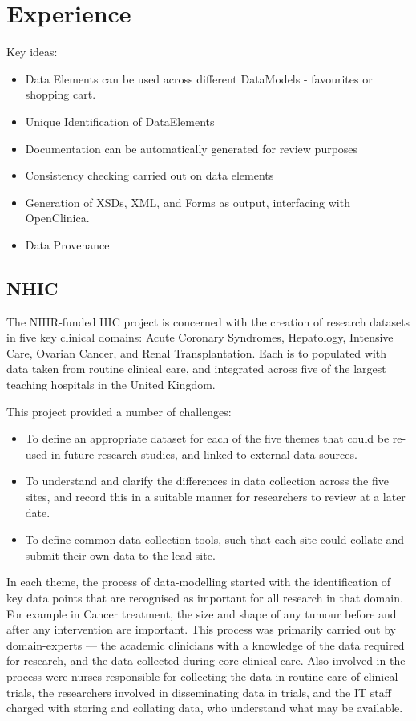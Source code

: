 \section{Experience}

Key ideas:

\begin{itemize}
	\item Data Elements can be used across different DataModels - favourites or shopping cart.
	\item Unique Identification of DataElements 
	\item Documentation can be automatically generated for review purposes
	\item Consistency checking carried out on data elements
	\item Generation of XSDs, XML, and Forms as output, interfacing with OpenClinica.
	\item Data Provenance
\end{itemize}


\subsection{NHIC}

The NIHR-funded HIC project is concerned with the creation of research
datasets in five key clinical domains: Acute Coronary Syndromes,
Hepatology, Intensive Care, Ovarian Cancer, and Renal Transplantation.
Each is to populated with data taken from routine clinical care, and
integrated across five of the largest teaching hospitals in the United
Kingdom.

This project provided a number of challenges:

\begin{itemize}
\item To define an appropriate dataset for each of the five themes
  that could be re-used in future research studies, and linked to
  external data sources.
\item To understand and clarify the differences in data collection
  across the five sites, and record this in a suitable manner for
  researchers to review at a later date.
\item To define common data collection tools, such that each site
  could collate and submit their own data to the lead site.

\end{itemize}

In each theme, the process of data-modelling started with the
identification of key data points that are recognised as important for
all research in that domain.  For example in Cancer treatment, the
size and shape of any tumour before and after any intervention are
important.  This process was primarily carried out by domain-experts ---
the academic clinicians with a knowledge of the data required for
research, and the data collected during core clinical care.  Also
involved in the process were nurses responsible for collecting the
data in routine care of clinical trials, the researchers involved in
disseminating data in trials, and the IT staff charged with storing
and collating data, who understand what may be available.

